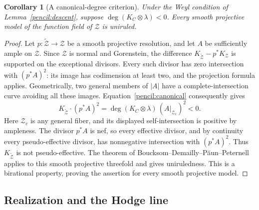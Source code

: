 \documentclass[11pt]{amsart}
\newtheorem{corollary}[theorem]{Corollary}
\theoremstyle{definition}
\theoremstyle{remark}
\numberwithin{equation}{section}
\begin{document}
\begin{corollary}[A canonical-degree criterion]
\label{pencil:uniruledcriterion}
Under the Weyl condition of Lemma~\ref{pencil:descent}, suppose
\(\deg(K_C\otimes\lambda)<0\).  Every smooth projective model of the
function field of \(\mathcal Z\) is uniruled.
\end{corollary}

\begin{proof}
Let \(p:\widetilde{\mathcal Z}\to\mathcal Z\) be a smooth projective
resolution, and let \(A\) be sufficiently ample on \(\mathcal Z\).
Since \(\mathcal Z\) is normal and Gorenstein, the difference
\(K_{\widetilde{\mathcal Z}}-p^*K_{\mathcal Z}\) is supported on the
exceptional divisors.  Every such divisor has zero intersection with
\((p^*A)^2\): its image has codimension at least two, and the projection
formula applies.  Geometrically, two general members of \(|A|\) have
a complete-intersection curve avoiding all these images.
Equation~\eqref{pencil:canonical} consequently gives
\[
 K_{\widetilde{\mathcal Z}}\cdot(p^*A)^2
   =\deg(K_C\otimes\lambda)\,(A|_{\mathcal Z_c})^2<0.
\]
Here \(\mathcal Z_c\) is any general fiber, and its displayed
self-intersection is positive by ampleness.  The divisor \(p^*A\)
is nef, so every effective divisor, and by continuity every
pseudo-effective divisor, has nonnegative intersection with
\((p^*A)^2\).  Thus \(K_{\widetilde{\mathcal Z}}\) is not
pseudo-effective.  The theorem of Boucksom--Demailly--P\u{a}un--Peternell
\cite[Corollary~0.3]{BDPP} applies to this smooth projective threefold
and gives uniruledness.  This is a birational
property, proving the assertion for every smooth projective model.
\end{proof}

\subsection{Realization and the Hodge line}
\end{document}

